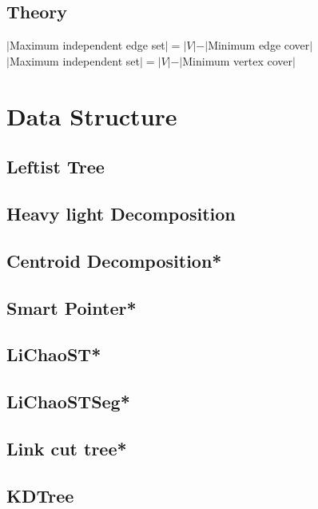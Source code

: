 \subsection{Theory}
\begin{footnotesize}
$|$Maximum independent edge set$|=|V|-|$Minimum edge cover$|$\\
$|$Maximum independent set$|=|V|-|$Minimum vertex cover$|$\\
\end{footnotesize}


\section{Data Structure}
\subsection{Leftist Tree}

\subsection{Heavy light Decomposition}

\subsection{Centroid Decomposition*} %

\subsection{Smart Pointer*}

\subsection{LiChaoST*}

\subsection{LiChaoSTSeg*}

\subsection{Link cut tree*} %

\subsection{KDTree}

